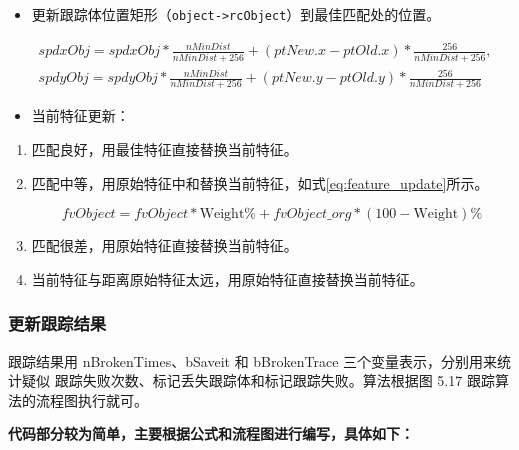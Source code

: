 \documentclass[12pt,hyperref,a4paper,UTF8]{ctexart}
\begin{document}
        \begin{itemize}
            \item 更新跟踪体位置矩形（\texttt{object->rcObject}）到最佳匹配处的位置。
        \end{itemize}
                \begin{align*}
                & spdxObj = spdxObj * \frac{nMinDist}{nMinDist + 256} + (ptNew.x - ptOld.x) * \frac{256}{nMinDist + 256}, \\
                & spdyObj = spdyObj * \frac{nMinDist}{nMinDist + 256} + (ptNew.y - ptOld.y) * \frac{256}{nMinDist + 256}
                \end{align*}
            
        \begin{itemize}
            \item 当前特征更新：
        \end{itemize}
            \begin{enumerate}
                \item 匹配良好，用最佳特征直接替换当前特征。
                \item 匹配中等，用原始特征中和替换当前特征，如式\eqref{eq:feature_update}所示。

                \begin{equation}\label{eq:feature_update}
                    fvObject = fvObject * \text{Weight}\% + fvObject\_org * (100 - \text{Weight})\%
                \end{equation}
                \item 匹配很差，用原始特征直接替换当前特征。
                \item 当前特征与距离原始特征太远，用原始特征直接替换当前特征。
            \end{enumerate}
        \subsubsection*{\large \textbf{更新跟踪结果}}

        跟踪结果用 nBrokenTimes、bSaveit 和 bBrokenTrace 三个变量表示，分别用来统计疑似
跟踪失败次数、标记丢失跟踪体和标记跟踪失败。算法根据图 5.17 跟踪算法的流程图执行就可。

        \large \textbf{代码部分较为简单，主要根据公式和流程图进行编写，具体如下：}
\end{document}
